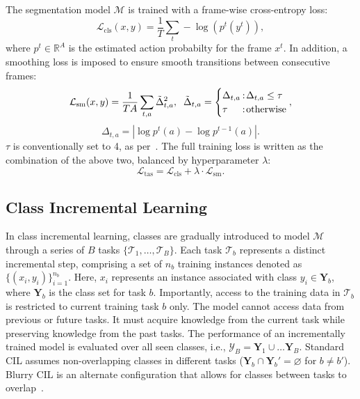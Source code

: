 The segmentation model $\mathcal{M}$ is trained with a frame-wise cross-entropy loss:
\begin{equation}\label{eq:cls}
    \mathcal{L}_{\text{cls}}(x,y) =  \frac{1}{T} \sum_t -\log(p^t(y^t)), 
\end{equation}
where $p^t \in \mathbb{R}^{A}$ is the estimated action probabilty for the frame $x^t$. In addition, a smoothing loss is imposed to ensure smooth transitions between consecutive frames:
\begin{equation}\label{eq:tmse}
    \mathcal{L}_{\text{sm}}(x,y) = \frac{1}{TA}\sum_{t,a}\tilde{\Delta}_{t,a}^2, \;\;
    \tilde{\Delta}_{t,a} = \begin{cases}
    \Delta_{t,a}\kern-0.8em &:\! \Delta_{t,a} \le \tau\\
    \tau \kern-0.8em&:\! \text{otherwise}
    \end{cases},
\end{equation}
\begin{equation}
    \Delta_{t,a} = \left|\log p^t(a) - \log p^{t-1}(a)\right|.\nonumber
\end{equation}
$\tau$ is conventionally set to 4, as per~\cite{farha2019ms}. The full training loss is written as the combination of the above two, balanced by hyperparameter $\lambda$:
\begin{equation}\label{eq:tas}
    \mathcal{L}_{\text{tas}} = \mathcal{L}_{\text{cls}} + \lambda\cdot \mathcal{L}_{\text{sm}}.
\end{equation}

\subsection{Class Incremental Learning}

In class incremental learning, classes are gradually introduced to model $\mathcal{M}$ through a series of $B$ tasks $\{ \mathcal{T}_1, \ldots, \mathcal{T}_B \}$. Each task $\mathcal{T}_b$ represents a distinct incremental step, comprising a set of $n_b$ training instances denoted as $\{(x_i, y_i)\}_{i=1}^{n_b}$. Here, $x_i$ represents an instance associated with class $y_i\in\mathbf{Y}_b$, where $\mathbf{Y}_b$ is the class set for task $b$. Importantly, access to the training data in $\mathcal{T}_b$ is restricted to current training task $b$ only. The model cannot access data from previous or future tasks. It must acquire knowledge from the current task while preserving knowledge from the past tasks. The performance of an incrementally trained model is evaluated over all seen classes, i.e., $\mathcal{Y}_B=\mathbf{Y}_1\cup \ldots \mathbf{Y}_B$. Standard CIL assumes non-overlapping classes in different tasks ($\mathbf{Y}_b\cap\mathbf{Y}_b'=\varnothing$ for $b\neq b'$). Blurry CIL is an alternate configuration that allows for classes between tasks to overlap~\cite{koh2022online,bang2021rainbow,bang2022online}. 

